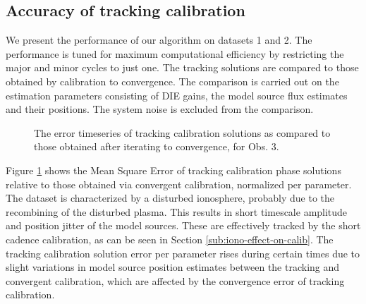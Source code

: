 \documentclass{aa}
\begin{document}
\subsection{Accuracy of tracking calibration}
We present the performance of our algorithm on datasets 1 and 2. The performance
is tuned for maximum computational efficiency by restricting the major and minor
cycles to  just one. The  tracking solutions are  compared to those  obtained by
calibration  to convergence.  The comparison  is carried  out on  the estimation
parameters consisting  of DIE gains, the  model source flux  estimates and their
positions. The system noise is excluded from the comparison.

\begin{figure}[tbh]

\caption{\label{fig:The-error-timeseries}The error timeseries of tracking
calibration solutions as compared to those obtained after iterating
to convergence, for Obs. 3.}
\end{figure}

Figure \ref{fig:The-error-timeseries}  shows the  Mean Square Error  of tracking
calibration  phase   solutions  relative   to  those  obtained   via  convergent
calibration,  normalized  per parameter.   The  dataset  is  characterized by  a
disturbed  ionosphere,  probably  due   to  the  recombining  of  the  disturbed
plasma. This  results in  short timescale amplitude  and position jitter  of the
model sources.  These are effectively  tracked by the short cadence calibration,
as  can  be  seen   in  Section  \ref{sub:iono-effect-on-calib}.   The  tracking
calibration  solution error  per parameter  rises  during certain  times due  to
slight variations  in model source  position estimates between the  tracking and
convergent calibration, which are affected  by the convergence error of tracking
calibration.
\end{document}
